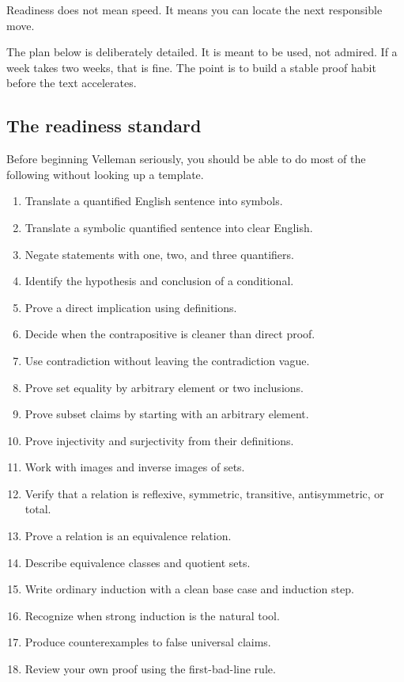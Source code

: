 \begin{focusbox}
Readiness does not mean speed. It means you can locate the next responsible move.
\end{focusbox}

The plan below is deliberately detailed. It is meant to be used, not admired. If a week takes two weeks, that is fine. The point is to build a stable proof habit before the text accelerates.

\subsection{The readiness standard}

Before beginning Velleman seriously, you should be able to do most of the following without looking up a template.

\begin{enumerate}
\item Translate a quantified English sentence into symbols.
\item Translate a symbolic quantified sentence into clear English.
\item Negate statements with one, two, and three quantifiers.
\item Identify the hypothesis and conclusion of a conditional.
\item Prove a direct implication using definitions.
\item Decide when the contrapositive is cleaner than direct proof.
\item Use contradiction without leaving the contradiction vague.
\item Prove set equality by arbitrary element or two inclusions.
\item Prove subset claims by starting with an arbitrary element.
\item Prove injectivity and surjectivity from their definitions.
\item Work with images and inverse images of sets.
\item Verify that a relation is reflexive, symmetric, transitive, antisymmetric, or total.
\item Prove a relation is an equivalence relation.
\item Describe equivalence classes and quotient sets.
\item Write ordinary induction with a clean base case and induction step.
\item Recognize when strong induction is the natural tool.
\item Produce counterexamples to false universal claims.
\item Review your own proof using the first-bad-line rule.
\end{enumerate}

